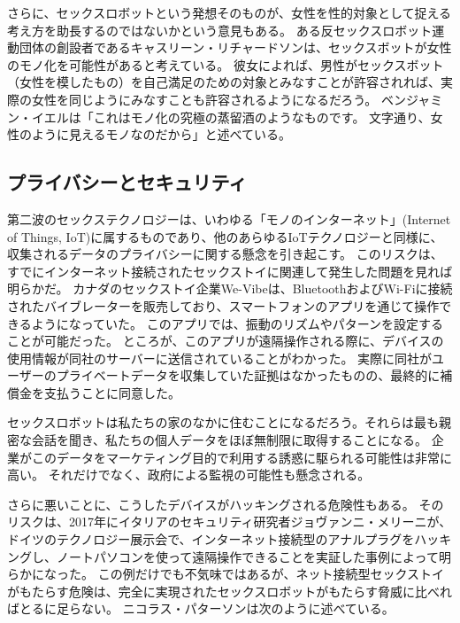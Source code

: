 \documentclass[paper=a4,book,openany]{jlreq}
\newcommand{\ig}[1]{}           %
\begin{document}
さらに、セックスロボットという発想そのものが、女性を性的対象として捉える考え方を助長するのではないかという意見もある。
ある反セックスロボット運動団体の創設者であるキャスリーン・リチャードソン\ig{Kathleen Richardson}は、セックスボットが女性のモノ化を可能性があると考えている。
彼女によれば、男性がセックスボット（女性を模したもの）を自己満足のための対象とみなすことが許容されれば、実際の女性を同じようにみなすことも許容されるようになるだろう\citep{richardson16:_asymm_relat}。
ベンジャミン・イエルは「これはモノ化の究極の蒸留酒のようなものです。
文字通り、女性のように見えるモノなのだから」と述べている\citep{mcdonald19:_sex_robot_are_almos_here}。

\subsection{プライバシーとセキュリティ}

第二波のセックステクノロジーは、いわゆる「モノのインターネット」(Internet of Things, IoT)に属するものであり、他のあらゆるIoTテクノロジーと同様に、収集されるデータのプライバシーに関する懸念を引き起こす。
このリスクは、すでにインターネット接続されたセックストイに関連して発生した問題を見れば明らかだ。
カナダのセックストイ企業We-Vibeは、BluetoothおよびWi-Fiに接続されたバイブレーターを販売しており、スマートフォンのアプリを通じて操作できるようになっていた。
このアプリでは、振動のリズムやパターンを設定することが可能だった。
ところが、このアプリが遠隔操作される際に、デバイスの使用情報が同社のサーバーに送信されていることがわかった。
実際に同社がユーザーのプライベートデータを収集していた証拠はなかったものの、最終的に補償金を支払うことに同意した\citep{freytas-tamura17:_maker_smart_vibrat_settl_data}。

セックスロボットは私たちの家のなかに住むことになるだろう。それらは最も親密な会話を聞き、私たちの個人データをほぼ無制限に取得することになる。
企業がこのデータをマーケティング目的で利用する誘惑に駆られる可能性は非常に高い。
それだけでなく、政府による監視の可能性も懸念される。

さらに悪いことに、こうしたデバイスがハッキングされる危険性もある。
そのリスクは、2017年にイタリアのセキュリティ研究者ジョヴァンニ・メリーニが、ドイツのテクノロジー展示会で、インターネット接続型のアナルプラグをハッキングし、ノートパソコンを使って遠隔操作できることを実証した事例によって明らかになった\citep{oberhaus17:_secur_resear_hacked_bluet_enabl_butt_plug}。
この例だけでも不気味ではあるが、ネット接続型セックストイがもたらす危険は、完全に実現されたセックスロボットがもたらす脅威に比べればとるに足らない。
ニコラス・パターソンは次のように述べている。
\end{document}
